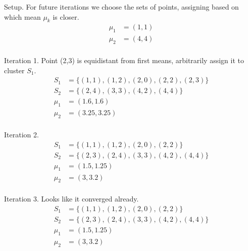 \documentclass[newpage]{homework}
\begin{document}
\maketitle


\question
Setup. For future iterations we choose the sets of points, assigning based on which mean $\mu_k$ is closer.
\begin{align*}
    \mu_1	&=	(1,1)	\\
    \mu_2   &=  (4,4)   \\
\end{align*}

Iteration 1. Point (2,3) is equidistant from first means, arbitrarily assign it to cluster $S_1$.
\begin{align*}
    S_1	&=  \{(1,1), (1,2), (2,0), (2,2), (2,3)\} 	\\
    S_2	&=  \{(2,4), (3,3), (4,2), (4,4)  \} 	\\
    \mu_1   &=  (1.6, 1.6)  \\
    \mu_2    &=	(3.25, 3.25)	\\
\end{align*}

Iteration 2.
\begin{align*}
    S_1	&=  \{(1,1), (1,2), (2,0), (2,2)\} 	\\
    S_2	&=  \{(2,3), (2,4), (3,3), (4,2), (4,4)  \} 	\\
    \mu_1   &=  (1.5, 1.25)  \\
    \mu_2    &=	(3, 3.2)	\\
\end{align*}

Iteration 3. Looks like it converged already.
\begin{align*}
    S_1	&=  \{(1,1), (1,2), (2,0), (2,2)\} 	\\
    S_2	&=  \{(2,3), (2,4), (3,3), (4,2), (4,4)  \} 	\\
    \mu_1   &=  (1.5, 1.25)  \\
    \mu_2    &=	(3, 3.2)	\\
\end{align*}
\end{document}
